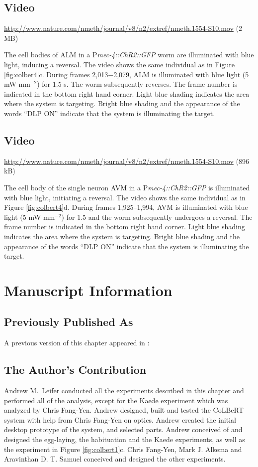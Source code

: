 \subsection{Video}\label{movie:colbert8} %
\url{http://www.nature.com/nmeth/journal/v8/n2/extref/nmeth.1554-S10.mov} (2 MB)

The cell bodies of ALM in a P\textit{mec-4::ChR2::GFP} worm are illuminated with blue light, inducing a reversal. The video shows the same individual as in Figure \ref{fig:colber4}c. During frames 2,013−2,079, ALM is illuminated with blue light (5 mW mm$^{−2}$) for 1.5 s. The worm subsequently reverses. The frame number is indicated in the bottom right hand corner. Light blue shading indicates the area where the system is targeting. Bright blue shading and the appearance of the words “DLP ON” indicate that the system is illuminating the target.

\subsection{Video}\label{movie:colbert9} %
\url{http://www.nature.com/nmeth/journal/v8/n2/extref/nmeth.1554-S10.mov} (896 kB)

The cell body of the single neuron AVM in a P\textit{mec-4::ChR2::GFP} is illuminated with blue light, initiating a reversal. The video shows the same individual as in Figure \ref{fig:colbert4}d. During frames 1,925–1,994, AVM is illuminated with blue light (5 mW mm$^{−2}$) for 1.5 and the worm subsequently undergoes a reversal. The frame number is indicated in the bottom right hand corner. Light blue shading indicates the area where the system is targeting. Bright blue shading and the appearance of the words “DLP ON” indicate that the system is illuminating the target.


\section{Manuscript Information}
\subsection{Previously Published As}
A previous version of this chapter appeared in \citep{leifer_optogenetic_2011}:


\subsection{The Author's Contribution}
Andrew M.~Leifer conducted all the experiments described in this chapter and performed all of the analysis, except for the Kaede experiment which was analyzed by Chris Fang-Yen. Andrew designed, built and tested the CoLBeRT system with help from Chris Fang-Yen on optics.  Andrew created the initial desktop prototype of the system, and selected		 parts.  Andrew conceived of and designed the egg-laying, the habituation and the Kaede experiments, as well as the experiment in Figure \ref{fig:colbert1}c.    Chris Fang-Yen, Mark J. Alkema and Aravinthan D. T. Samuel conceived and designed the other experiments. 


